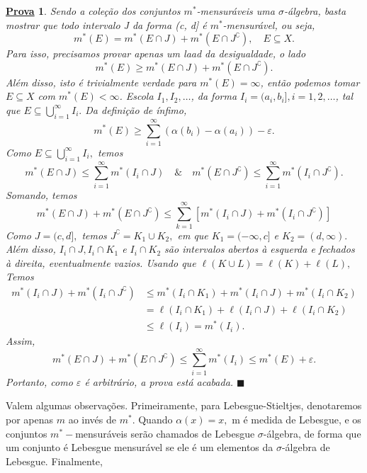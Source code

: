 \documentclass{article}
\newtheorem*{proof*}{\underline{Prova}}
\renewcommand\qedsymbol{$\blacksquare$}
\begin{document}
\begin{proof*}
	Sendo a coleção dos conjuntos \(m^{*}\)-mensuráveis uma \(\sigma\)-álgebra, basta mostrar que todo intervalo J da forma (c, d] é \(m^{*}\)-mensurável, ou seja,
	\[
		m^{*}(E) = m^{*}(E\cap J) + m^{*}(E\cap J ^{\complement}),\quad E\subseteq X.
	\]
	Para isso, precisamos provar apenas um laad da desigualdade, o lado
	\[
		m^{*}(E) \geq m^{*}(E\cap J) + m^{*}(E\cap J ^{\complement}).
	\]
	Além disso, isto é trivialmente verdade para \(m^{*}(E) = \infty\), então podemos tomar \(E\subseteq X\) com \(m^{*}(E) < \infty\). Escola \(I_{1}, I_2, \dotsc \), da forma
	\(I_{i} = (a_{i}, b_{i}], i = 1, 2, \dotsc \), tal que \(E \subseteq \bigcup_{i=1}^{\infty}I_{i}.\) Da definição de ínfimo,
	\[
		m^{*}(E) \geq \sum\limits_{i=1}^{\infty}(\alpha (b_{i}) - \alpha (a_{i})) - \varepsilon .
	\]
	Como \(E \subseteq \bigcup_{i=1}^{\infty}I_{i},\) temos
	\[
		m^{*}(E\cap J) \leq \sum\limits_{i=1}^{\infty}m^{*}(I_{i}\cap J)\quad\&\quad m^{*}(E\cap J ^{\complement}) \leq \sum\limits_{i=1}^{\infty}m^{*}(I_{i}\cap J ^{\complement}).
	\]
	Somando, temos
	\[
		m^{*}(E\cap J) + m^{*}(E\cap J ^{\complement}) \leq \sum\limits_{k=1}^{\infty}[m^{*}(I_{i}\cap J) + m^{*}(I_{i}\cap J ^{\complement})]
	\]
	Como \(J = (c, d],\) temos \(J ^{\complement} = K_1 \cup K_2,\) em que \(K_1 = (-\infty, c]\) e \(K_2 = (d, \infty).\) Além disso, \(I_{i}\cap J, I_{i}\cap K_1\) e \(I_{i}\cap K_2\) são intervalos
	abertos à esquerda e fechados à direita, eventualmente vazios. Usando que \(\ell (K\cup L) = \ell (K) + \ell (L),\) Temos
	\begin{align*}
		m^{*}(I_{i}\cap J) + m^{*}(I_{i}\cap J ^{\complement}) & \leq m^{*}(I_{i}\cap K_1) + m^{*}(I_{i}\cap J) + m^{*}(I_{i}\cap K_2) \\
		                                                       & = \ell (I_{i}\cap K_1) + \ell (I_{i}\cap J) + \ell(I_{i}\cap K_2)     \\
		                                                       & \leq \ell (I_{i}) = m^{*}(I_{i}).
	\end{align*}
	Assim,
	\[
		m^{*}(E\cap J) + m^{*}(E\cap J ^{\complement}) \leq \sum\limits_{i=1}^{\infty}m^{*}(I_{i}) \leq m^{*}(E) + \varepsilon .
	\]
	Portanto, como \(\varepsilon \) é arbitrário, a prova está acabada. \qedsymbol
\end{proof*}
Valem algumas observações. Primeiramente, para Lebesgue-Stieltjes, denotaremos por apenas \(m\) ao invés de \(m^{*}.\) Quando \(\alpha (x) = x,\) m é medida de Lebesgue, e os conjuntos
\(m^{*}-\)mensuráveis serão chamados de Lebesgue \(\sigma \)-álgebra, de forma que um conjunto é Lebesgue mensurável se ele é um elementos da \(\sigma \)-álgebra de Lebesgue. Finalmente,
\end{document}
